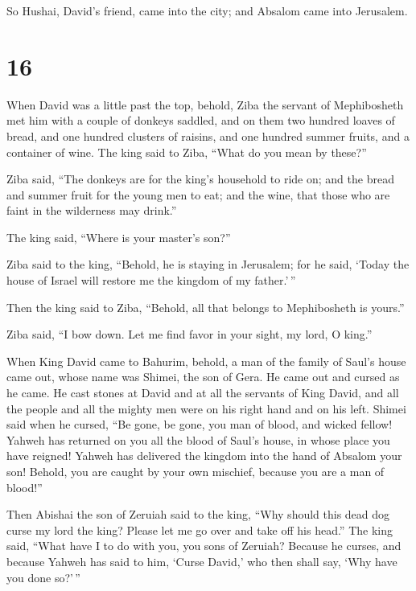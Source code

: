  So Hushai, David's friend, came into the city; and
Absalom came into Jerusalem.

\hypertarget{section-15}{%
\section{16}\label{section-15}}

 When David was a little past the top, behold, Ziba the
servant of Mephibosheth met him with a couple of donkeys saddled, and on
them two hundred loaves of bread, and one hundred clusters of raisins,
and one hundred summer fruits, and a container of wine. 
The king said to Ziba, ``What do you mean by these?''

Ziba said, ``The donkeys are for the king's household to ride on; and
the bread and summer fruit for the young men to eat; and the wine, that
those who are faint in the wilderness may drink.''

 The king said, ``Where is your master's son?''

Ziba said to the king, ``Behold, he is staying in Jerusalem; for he
said, `Today the house of Israel will restore me the kingdom of my
father.'\,''

 Then the king said to Ziba, ``Behold, all that belongs to
Mephibosheth is yours.''

Ziba said, ``I bow down. Let me find favor in your sight, my lord, O
king.''

 When King David came to Bahurim, behold, a man of the
family of Saul's house came out, whose name was Shimei, the son of Gera.
He came out and cursed as he came.  He cast stones at
David and at all the servants of King David, and all the people and all
the mighty men were on his right hand and on his left. 
Shimei said when he cursed, ``Be gone, be gone, you man of blood, and
wicked fellow!  Yahweh has returned on you all the blood
of Saul's house, in whose place you have reigned! Yahweh has delivered
the kingdom into the hand of Absalom your son! Behold, you are caught by
your own mischief, because you are a man of blood!''

 Then Abishai the son of Zeruiah said to the king, ``Why
should this dead dog curse my lord the king? Please let me go over and
take off his head.''  The king said, ``What have I to do
with you, you sons of Zeruiah? Because he curses, and because Yahweh has
said to him, `Curse David,' who then shall say, `Why have you done
so?'\,''

